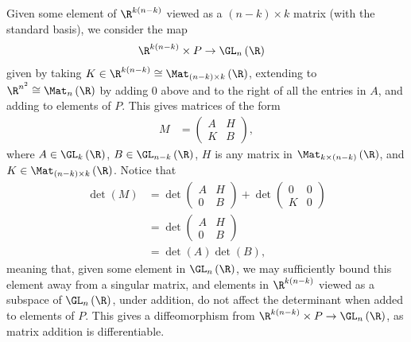 \documentclass[10pt]{mypackage}
\begin{document}
\begin{solution}
Given some element of $\R^{k\left( n-k \right)}$ viewed as a $\left( n-k \right)\times k$ matrix (with the standard basis), we consider the map
\begin{align*}
  \R^{k\left( n-k \right)}\times P &\rightarrow \GL_{n}\left( \R \right)
\end{align*}
given by taking $K\in \R^{k\left( n-k \right)}\cong \Mat_{\left( n-k \right)\times k}\left( \R \right)$, extending to $\R^{n^2}\cong \Mat_{n}\left( \R \right)$ by adding $0$ above and to the right of all the entries in $A$, and adding to elements of $P$. This gives matrices of the form
\begin{align*}
  M &= \begin{pmatrix} A & H \\ K & B\end{pmatrix},
\end{align*}
where $A\in \GL_{k}\left( \R \right)$, $B\in \GL_{n-k}\left( \R \right)$, $H$ is any matrix in $\Mat_{k\times \left( n-k \right)}\left( \R \right)$, and $K\in \Mat_{\left( n-k \right)\times k}\left( \R \right)$. Notice that
\begin{align*}
  \det\left( M \right) &= \det \begin{pmatrix}A & H \\ 0 & B\end{pmatrix} + \det \begin{pmatrix}0 & 0 \\ K & 0\end{pmatrix}\\
                       &= \det \begin{pmatrix}A & H \\ 0 & B\end{pmatrix}\\
                       &= \det\left( A \right)\det\left( B \right),
\end{align*}
meaning that, given some element in $\GL_{n}\left( \R \right)$, we may sufficiently bound this element away from a singular matrix, and elements in $\R^{k\left( n-k \right)}$ viewed as a subspace of $\GL_{n}\left( \R \right)$, under addition, do not affect the determinant when added to elements of $P$. This gives a diffeomorphism from $\R^{k\left( n-k \right)}\times P \rightarrow \GL_{n}\left( \R \right)$, as matrix addition is differentiable.\newline


\end{solution}
\end{document}
